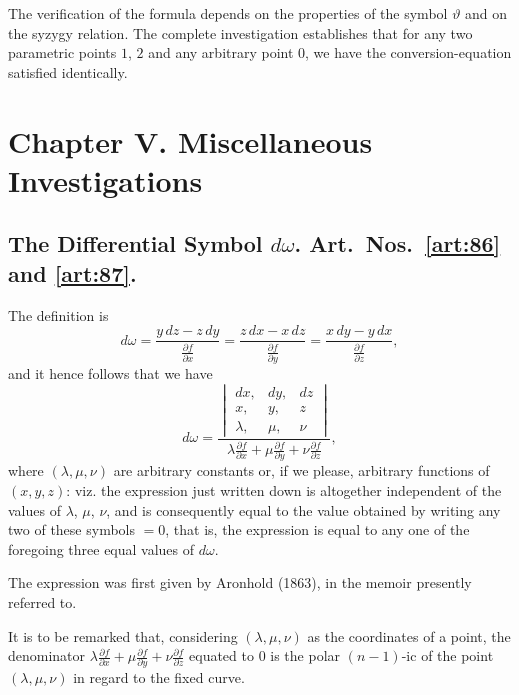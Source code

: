 \documentclass[11pt,a4paper]{book}
\begin{document}
\begin{art}\label{art:79}
The verification of the formula depends on the properties of the symbol $\vartheta$ and on the syzygy relation. The complete investigation establishes that for any two parametric points $1$, $2$ and any arbitrary point $0$, we have the conversion-equation satisfied identically.
\end{art}

\newpage
\section*{Chapter V. Miscellaneous Investigations}

\subsection*{The Differential Symbol $d\omega$. Art.~Nos.~\ref{art:86} and \ref{art:87}.}

\begin{art}\label{art:86}
The definition is
\[
d\omega = \frac{y\,dz - z\,dy}{\frac{\partial f}{\partial x}} = \frac{z\,dx - x\,dz}{\frac{\partial f}{\partial y}} = \frac{x\,dy - y\,dx}{\frac{\partial f}{\partial z}},
\]
and it hence follows that we have
\[
d\omega = \frac{\begin{vmatrix} dx, & dy, & dz \\ x, & y, & z \\ \lambda, & \mu, & \nu \end{vmatrix}}{\lambda\frac{\partial f}{\partial x} + \mu\frac{\partial f}{\partial y} + \nu\frac{\partial f}{\partial z}},
\]
where $(\lambda, \mu, \nu)$ are arbitrary constants or, if we please, arbitrary functions of $(x, y, z)$: viz. the expression just written down is altogether independent of the values of $\lambda$, $\mu$, $\nu$, and is consequently equal to the value obtained by writing any two of these symbols $= 0$, that is, the expression is equal to any one of the foregoing three equal values of $d\omega$.

The expression was first given by Aronhold (1863), in the memoir presently referred to.
\end{art}

\newpage
It is to be remarked that, considering $(\lambda, \mu, \nu)$ as the coordinates of a point, the denominator $\lambda\frac{\partial f}{\partial x} + \mu\frac{\partial f}{\partial y} + \nu\frac{\partial f}{\partial z}$ equated to $0$ is the polar $(n - 1)$-ic of the point $(\lambda, \mu, \nu)$ in regard to the fixed curve.
\end{document}
